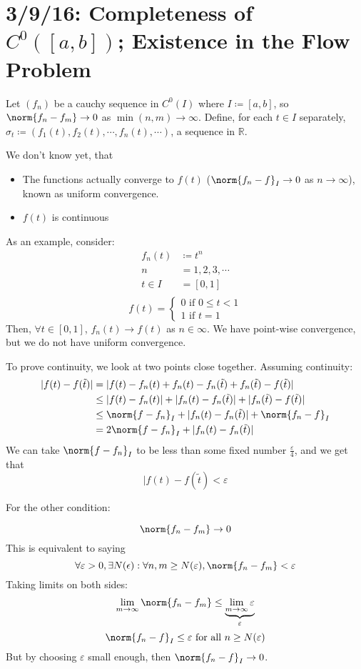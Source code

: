 \documentclass[12pt]{article}
\begin{document}
\section{3/9/16: Completeness of $C^0([a,b])$; Existence in the Flow Problem}
Let $(f_n)$ be a cauchy sequence in $C^0(I)$ where $I \coloneqq [a,b]$, so $\norm{f_n - f_m} \to 0$ as $\min(n,m) \to \infty$. Define, for each $t \in I$ separately, $\sigma_t \coloneqq (f_1(t), f_2(t), \cdots, f_n(t), \cdots )$, a sequence in $\mathbb{R}$. 

We don't know yet, that 
\begin{itemize}
\item The functions actually converge to $f(t)$ ($\norm{f_n - f}_I \to 0$ as $n \to \infty$), known as uniform convergence. 
\item $f(t)$ is continuous
\end{itemize}

As an example, consider:
\[
\begin{aligned}
f_n(t) &\coloneqq t^n \\
n &= 1,2,3,\cdots \\
t \in I &= [0,1] \\
\end{aligned}
\]
\[
f(t) = 
\begin{cases}
0 \text{ if } 0 \le t < 1 \\
1 \text{ if } t = 1
\end{cases}
\]
Then, $\forall t \in [0,1]$, $f_n(t) \to f(t)$ as $n \in \infty$. We have point-wise convergence, but we do not have uniform convergence. 

To prove continuity, we look at two points close together. Assuming continuity:
\[ 
\begin{aligned}
|f(t) - f(\tilde{t})| &= |f(t) - f_n(t) + f_n(t) - f_n(\tilde{t}) + f_n(\tilde{t}) - f(\tilde{t})| \\
&\le |f(t) - f_n(t)| + |f_n(t) - f_n(\tilde{t})| + |f_n(\tilde{t}) - f(\tilde{t})| \\
&\le \norm{f - f_n}_I + |f_n(t) - f_n(\tilde{t})| + \norm{f_n - f}_I \\
&= 2\norm{f - f_n}_I + |f_n(t) - f_n(\tilde{t})|
\end{aligned}
 \]
We can take $\norm{f - f_n}_I$ to be less than some fixed number $\frac{\varepsilon}{4}$, and we get that \[ |f(t) - f(\tilde{t}) < \varepsilon \]

For the other condition:

\[ \norm{f_n - f_m} \to 0 \]
This is equivalent to saying
\[ \forall \varepsilon > 0, \exists N(\epsilon): \forall n,m \ge N(\varepsilon), \norm{f_n - f_m} < \varepsilon \]
Taking limits on both sides:
\[ \lim_{m \to \infty}\norm{f_n - f_m} \le \underbrace{\lim_{m \to \infty}\varepsilon}_{\varepsilon} \]
\[ \norm{f_n - f}_I \le \varepsilon \text{ for all } n \ge N(\varepsilon) \]
But by choosing $\varepsilon$ small enough, then $\norm{f_n - f}_I \to 0$. 
\end{document}
